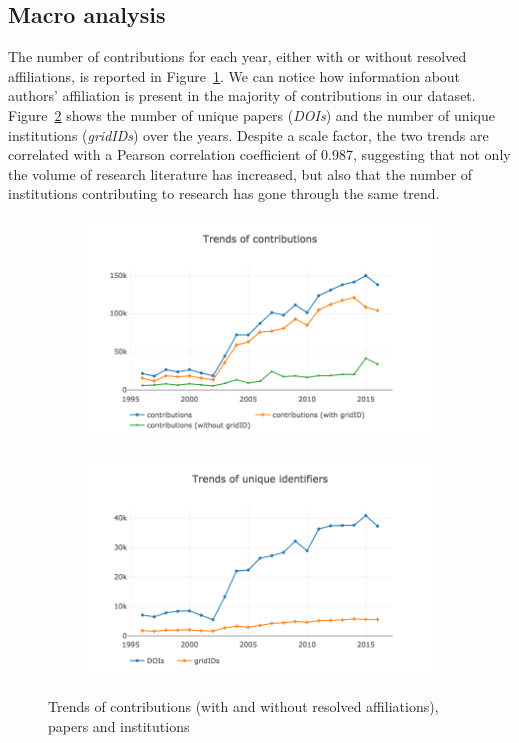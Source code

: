 \documentclass{llncs}
\begin{document}
\subsection{Macro analysis}
The number of contributions for each year, either with or without resolved affiliations, is reported in Figure~\ref{fig:macro_contributions}.
We can notice how information about authors' affiliation is present in the majority of contributions in our dataset.
Figure~\ref{fig:macro_identifiers} shows the number of unique papers (\textit{DOIs}) and the number of unique institutions (\textit{gridIDs}) over the years.
Despite a scale factor, the two trends are correlated with a Pearson correlation coefficient\cite{pearson1896mathematical} of 0.987, suggesting that not only the volume of research literature has increased, but also that the number of institutions contributing to research has gone through the same trend.
%
\begin{figure}[t]
\begin{subfigure}{.5\textwidth}
    \centering
	\includegraphics[width=\textwidth]{images/macro_contributions.png}
	\caption[ ]{}
	\label{fig:macro_contributions}
\end{subfigure}%
\begin{subfigure}{.5\textwidth}
	\centering
	\includegraphics[width=\textwidth]{images/macro_identifiers.png}
	\caption[ ]{}
	\label{fig:macro_identifiers}
\end{subfigure}
\caption{Trends of contributions (with and without resolved affiliations), papers and institutions}
\label{fig:macro_preliminary}
\end{figure}
\end{document}
